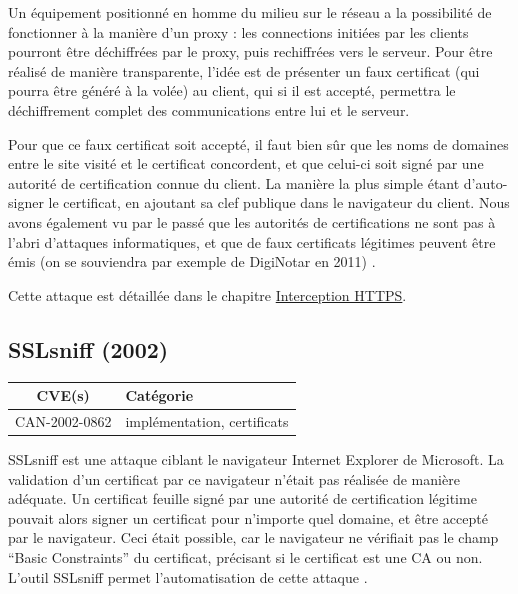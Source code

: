 Un équipement positionné en homme du milieu sur le réseau a la possibilité de fonctionner à la manière d'un proxy : les connections initiées par les clients pourront être déchiffrées par le proxy, puis rechiffrées vers le serveur. Pour être réalisé de manière transparente, l'idée est de présenter un faux certificat (qui pourra être généré à la volée) au client, qui si il est accepté, permettra le déchiffrement complet des communications entre lui et le serveur.

Pour que ce faux certificat soit accepté, il faut bien sûr que les noms de domaines entre le site visité et le certificat concordent, et que celui-ci soit signé par une autorité de certification connue du client. La manière la plus simple étant d'auto-signer le certificat, en ajoutant sa clef publique dans le navigateur du client. Nous avons également vu par le passé que les autorités de certifications ne sont pas à l'abri d'attaques informatiques, et que de faux certificats légitimes peuvent être émis (on se souviendra par exemple de DigiNotar en 2011) \cite{https-interception}.

Cette attaque est détaillée dans le chapitre \hyperref[sec:https-interception]{Interception HTTPS}.



\subsection{SSLsniff (2002)}

\begin{tabularx}{0.96\textwidth}{|c|X|}
  \hline
  \textbf{CVE(s)} & \textbf{Catégorie} \\
  \hline
  CAN-2002-0862 & implémentation, certificats \\
  \hline
\end{tabularx}

\vspace{1em}

SSLsniff est une attaque ciblant le navigateur Internet Explorer de Microsoft. La validation d'un certificat par ce navigateur n'était pas réalisée de manière adéquate. Un certificat feuille signé par une autorité de certification légitime pouvait alors signer un certificat pour n'importe quel domaine, et être accepté par le navigateur. Ceci était possible, car le navigateur ne vérifiait pas le champ ``Basic Constraints'' du certificat, précisant si le certificat est une CA ou non. L'outil SSLsniff permet l'automatisation de cette attaque \cite{sslsniff-website}.



